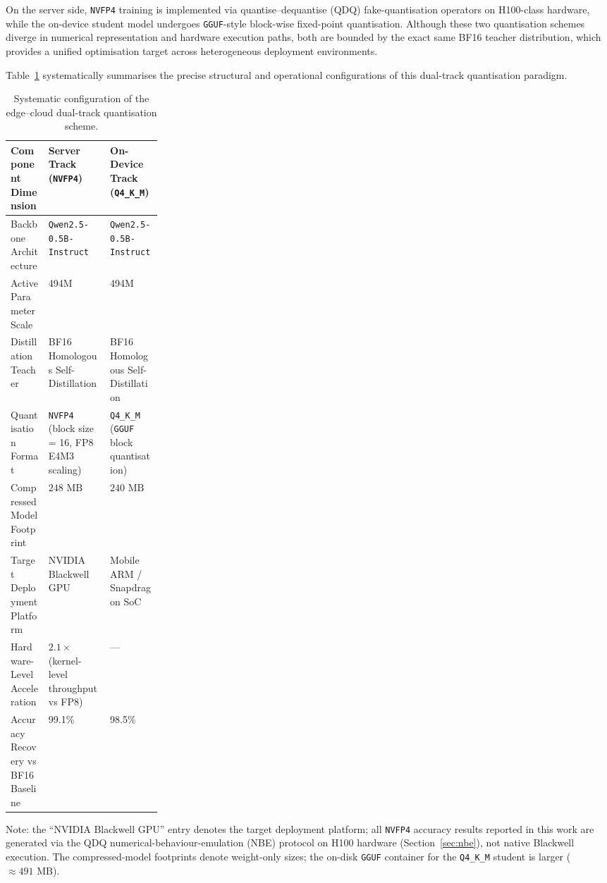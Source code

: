 \documentclass[a4paper,fleqn]{cas-sc}
\begin{document}
On the server side, \texttt{NVFP4} training is implemented via quantise--dequantise (QDQ) fake-quantisation operators on H100-class hardware, while the on-device student model undergoes \texttt{GGUF}-style block-wise fixed-point quantisation. Although these two quantisation schemes diverge in numerical representation and hardware execution paths, both are bounded by the exact same BF16 teacher distribution, which provides a unified optimisation target across heterogeneous deployment environments.

Table~\ref{tab2-en} systematically summarises the precise structural and operational configurations of this dual-track quantisation paradigm.

\begin{table}[t]
\centering
\renewcommand{\arraystretch}{1.15}
\caption{Systematic configuration of the edge--cloud dual-track quantisation scheme.}
\label{tab2-en}
\setlength{\tabcolsep}{8pt}
\begin{tabularx}{\textwidth}{>{\raggedright\arraybackslash}p{0.25\linewidth}XX}
\toprule
\textbf{Component Dimension} & \textbf{Server Track (\texttt{NVFP4})} & \textbf{On-Device Track (\texttt{Q4\_K\_M})} \\
\midrule
Backbone Architecture & \texttt{Qwen2.5-0.5B-Instruct} & \texttt{Qwen2.5-0.5B-Instruct} \\
Active Parameter Scale & 494M & 494M \\
Distillation Teacher & BF16 Homologous Self-Distillation & BF16 Homologous Self-Distillation \\
Quantisation Format & \texttt{NVFP4} (block size = 16, FP8 E4M3 scaling) & \texttt{Q4\_K\_M} (\texttt{GGUF} block quantisation) \\
Compressed Model Footprint & $248\text{~MB}$ & $240\text{~MB}$ \\
Target Deployment Platform & NVIDIA Blackwell GPU & Mobile ARM / Snapdragon SoC \\
Hardware-Level Acceleration & $2.1\times$ (kernel-level throughput vs FP8) & --- \\
Accuracy Recovery vs BF16 Baseline & 99.1\% & 98.5\% \\
\bottomrule
\end{tabularx}

\vspace{1mm}
\footnotesize
Note: the ``NVIDIA Blackwell GPU'' entry denotes the target deployment platform; all \texttt{NVFP4} accuracy results reported in this work are generated via the QDQ numerical-behaviour-emulation (NBE) protocol on H100 hardware (Section~\ref{sec:nbe}), not native Blackwell execution. The compressed-model footprints denote weight-only sizes; the on-disk \texttt{GGUF} container for the \texttt{Q4\_K\_M} student is larger ($\approx 491\text{~MB}$).
\end{table}
\end{document}
